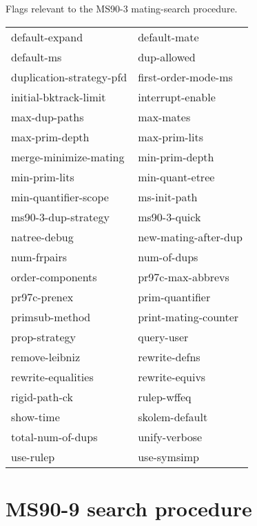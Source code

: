 \begin{description} 
\item[MS90-3]  
Flags relevant to the MS90-3 mating-search procedure.

\begin{tabular}{l l}
default-expand&default-mate\\
default-ms&dup-allowed\\
duplication-strategy-pfd&first-order-mode-ms\\
initial-bktrack-limit&interrupt-enable\\
max-dup-paths&max-mates\\
max-prim-depth&max-prim-lits\\
merge-minimize-mating&min-prim-depth\\
min-prim-lits&min-quant-etree\\
min-quantifier-scope&ms-init-path\\
ms90-3-dup-strategy&ms90-3-quick\\
natree-debug&new-mating-after-dup\\
num-frpairs&num-of-dups\\
order-components&pr97c-max-abbrevs\\
pr97c-prenex&prim-quantifier\\
primsub-method&print-mating-counter\\
prop-strategy&query-user\\
remove-leibniz&rewrite-defns\\
rewrite-equalities&rewrite-equivs\\
rigid-path-ck&rulep-wffeq\\
show-time&skolem-default\\
total-num-of-dups&unify-verbose\\
use-rulep&use-symsimp\\
\end{tabular}
\item
\end{description}

\section{MS90-9 search procedure}

